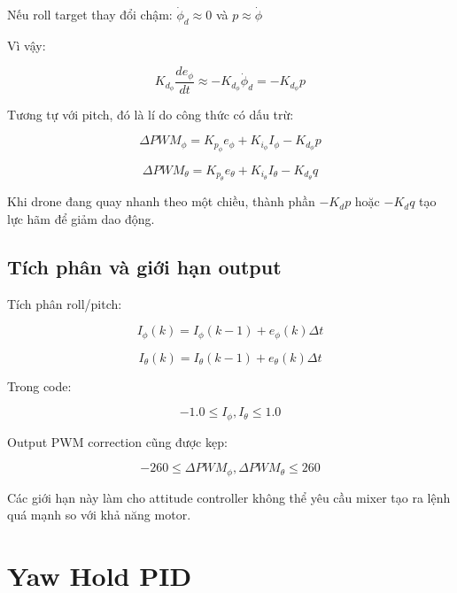 Nếu roll target thay đổi chậm: $\dot{\phi}_d \approx 0$ và $p \approx \dot{\phi}$


Vì vậy:

\begin{equation}
    K_{d_\phi}\frac{d e_\phi}{dt}
    \approx
    -K_{d_\phi}\dot{\phi}_d
    =
    -K_{d_\phi}p
\end{equation}

Tương tự với pitch, đó là lí do công thức có dấu trừ:

\begin{equation}
    \Delta PWM_\phi
    =
    K_{p_\phi}e_\phi
    +
    K_{i_\phi}I_\phi
    -
    K_{d_\phi}p
\end{equation}

\begin{equation}
    \Delta PWM_\theta
    =
    K_{p_\theta}e_\theta
    +
    K_{i_\theta}I_\theta
    -
    K_{d_\theta}q
\end{equation}

Khi drone đang quay nhanh theo một chiều, thành phần $-K_d p$ hoặc $-K_d q$
tạo lực hãm để giảm dao động.

\subsection{Tích phân và giới hạn output}

Tích phân roll/pitch:

\begin{equation}
    I_\phi(k)=I_\phi(k-1)+e_\phi(k)\Delta t
\end{equation}

\begin{equation}
    I_\theta(k)=I_\theta(k-1)+e_\theta(k)\Delta t
\end{equation}

Trong code:

\begin{equation}
    -1.0 \leq I_\phi,I_\theta \leq 1.0
\end{equation}

Output PWM correction cũng được kẹp:

\begin{equation}
    -260
    \leq
    \Delta PWM_\phi,\Delta PWM_\theta
    \leq
    260
\end{equation}

Các giới hạn này làm cho attitude controller không thể yêu cầu mixer tạo ra
lệnh quá mạnh so với khả năng motor.

\section{Yaw Hold PID}

